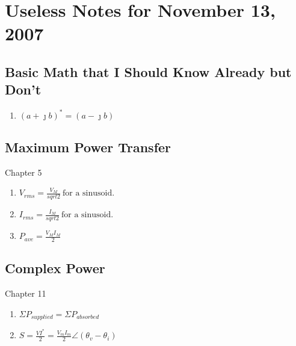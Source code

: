 \documentclass[12pt]{article}
\begin{document}
\section*{Useless Notes for November 13, 2007}

\subsection*{Basic Math that I Should Know Already but Don't}

\begin{enumerate}

\item $(a+\jmath b)^* = (a-\jmath b)$

\end{enumerate}


\subsection*{Maximum Power Transfer}

Chapter 5

\begin{enumerate}

\item $V_{rms} = \frac{V_M}{sqrt{2}}\  \mbox{for a sinusoid}$.

\item $I_{rms} = \frac{I_M}{sqrt{2}}\  \mbox{for a sinusoid}$.

\item $P_{ave} = \frac{V_M I_M}{2}$

\end{enumerate}


\subsection*{Complex Power}

Chapter 11

\begin{enumerate}

\item $\Sigma P_{supplied} = \Sigma P_{absorbed}$

\item $S = \frac{VI^* }{2} = \frac{V_m I_m}{2} \angle{(\theta _v - \theta _i)}$

\end{enumerate}
\end{document}
